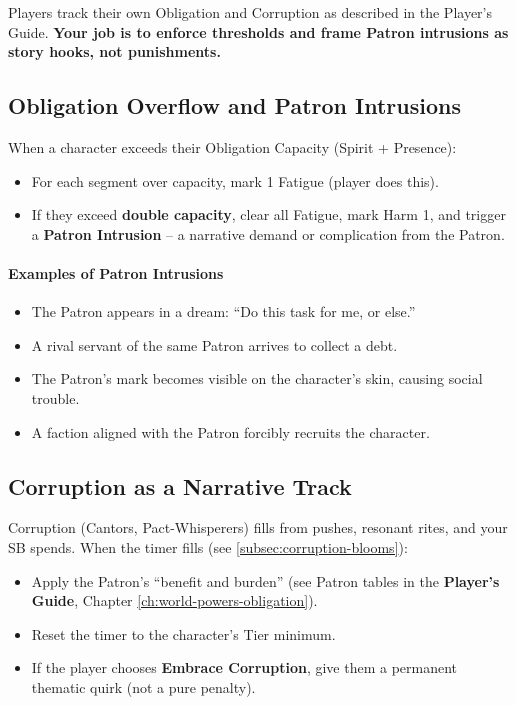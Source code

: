 Players track their own Obligation and Corruption as described in the Player's Guide. \textbf{Your job is to enforce thresholds and frame Patron intrusions as story hooks, not punishments.}

\subsection*{Obligation Overflow and Patron Intrusions}
When a character exceeds their Obligation Capacity (Spirit + Presence):
\begin{itemize}
  \item For each segment over capacity, mark 1 Fatigue (player does this).
  \item If they exceed \textbf{double capacity}, clear all Fatigue, mark Harm 1, and trigger a \textbf{Patron Intrusion} -- a narrative demand or complication from the Patron.
\end{itemize}

\paragraph{Examples of Patron Intrusions}
\begin{itemize}
  \item The Patron appears in a dream: ``Do this task for me, or else.''
  \item A rival servant of the same Patron arrives to collect a debt.
  \item The Patron's mark becomes visible on the character's skin, causing social trouble.
  \item A faction aligned with the Patron forcibly recruits the character.
\end{itemize}

\subsection*{Corruption as a Narrative Track}
Corruption (Cantors, Pact-Whisperers) fills from pushes, resonant rites, and your SB spends. When the timer fills (see \ref{subsec:corruption-blooms}):
\begin{itemize}
  \item Apply the Patron's ``benefit and burden'' (see Patron tables in the \textbf{Player's Guide}, Chapter \ref{ch:world-powers-obligation}).
  \item Reset the timer to the character's Tier minimum.
  \item If the player chooses \textbf{Embrace Corruption}, give them a permanent thematic quirk (not a pure penalty).
\end{itemize}


